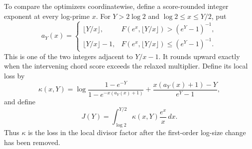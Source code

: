 To compare the optimizers coordinatewise, define a score-rounded integer
exponent at every log-prime \(x\). For
\(Y>2\log2\) and \(\log2\leq x\leq Y/2\), put
\begin{equation}
\label{e-rounded-exponent}
    a_Y(x)
    =
    \begin{cases}
    \lfloor Y/x\rfloor,
        &F(e^x,\lfloor Y/x\rfloor)>(e^Y-1)^{-1},\\
    \lfloor Y/x\rfloor-1,
        &F(e^x,\lfloor Y/x\rfloor)\leq(e^Y-1)^{-1}.
    \end{cases}
\end{equation}
This is one of the two integers adjacent to \(Y/x-1\). It rounds upward
exactly when the intervening chord score exceeds the relaxed multiplier.
Define its local loss by
\begin{equation}
\label{e-kappa}
    \kappa(x,Y)
    =
    \log\frac{1-e^{-Y}}
              {1-e^{-x(a_Y(x)+1)}}
    +
    \frac{x(a_Y(x)+1)-Y}{e^Y-1},
\end{equation}
and define
\begin{equation}
\label{e-rounding-integral}
    J(Y)
    =
    \int_{\log2}^{Y/2}
    \kappa(x,Y)\frac{e^x}{x}\,dx.
\end{equation}
Thus \(\kappa\) is the loss in the local divisor factor after the
first-order log-size change has been removed.

